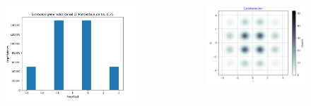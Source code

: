 \begin{frame}
  \begin{columns}
    \begin{column}{0.48\linewidth}  
        \begin{figure}
        \centering
        \includegraphics[width=\textwidth]{Graficos/coded_symbols_6.png}
        \end{figure}
    \end{column}
    \begin{column}{0.408\linewidth}
        \vspace{0.15cm}
        \begin{figure}
            \centering
            \includegraphics[width=\textwidth]{Graficos/Constellation_025.png}
        \end{figure}
    \end{column}
\end{columns}
  
\end{frame}

